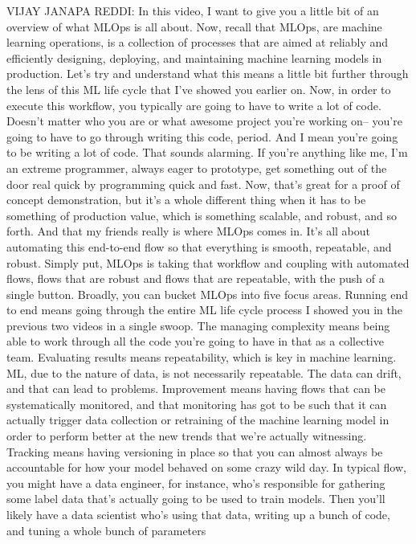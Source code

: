 VIJAY JANAPA REDDI: In this video, I want
to give you a little bit of an overview of what MLOps is all about.
Now, recall that MLOps, are machine learning operations,
is a collection of processes that are aimed
at reliably and efficiently designing, deploying, and maintaining machine
learning models in production.
Let's try and understand what this means a little bit
further through the lens of this ML life cycle that I've showed you earlier on.
Now, in order to execute this workflow, you typically
are going to have to write a lot of code.
Doesn't matter who you are or what awesome project
you're working on-- you're going to have to go
through writing this code, period.
And I mean you're going to be writing a lot of code.
That sounds alarming.
If you're anything like me, I'm an extreme programmer, always
eager to prototype, get something out of the door real quick
by programming quick and fast.
Now, that's great for a proof of concept demonstration,
but it's a whole different thing when it has
to be something of production value, which is something
scalable, and robust, and so forth.
And that my friends really is where MLOps comes in.
It's all about automating this end-to-end flow
so that everything is smooth, repeatable, and robust.
Simply put, MLOps is taking that workflow and coupling
with automated flows, flows that are robust
and flows that are repeatable, with the push of a single button.
Broadly, you can bucket MLOps into five focus areas.
Running end to end means going through the entire ML life cycle process
I showed you in the previous two videos in a single swoop.
The managing complexity means being able to work
through all the code you're going to have in that as a collective team.
Evaluating results means repeatability, which is key in machine learning.
ML, due to the nature of data, is not necessarily repeatable.
The data can drift, and that can lead to problems.
Improvement means having flows that can be systematically monitored,
and that monitoring has got to be such that it can actually
trigger data collection or retraining of the machine learning model in order
to perform better at the new trends that we're actually witnessing.
Tracking means having versioning in place
so that you can almost always be accountable for how your model behaved
on some crazy wild day.
In typical flow, you might have a data engineer,
for instance, who's responsible for gathering
some label data that's actually going to be used to train models.
Then you'll likely have a data scientist who's using that data,
writing up a bunch of code, and tuning a whole bunch of parameters
